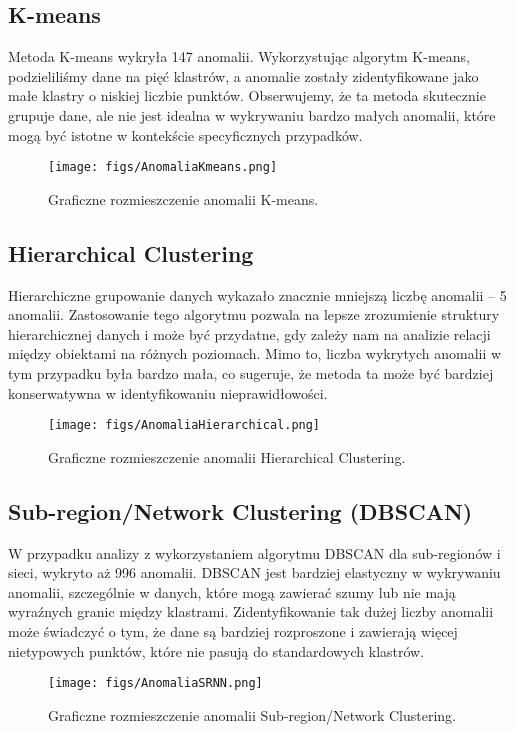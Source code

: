 \documentclass[a4paper,fleqn]{cas-dc}
\begin{document}
\subsection{K-means}
Metoda K-means wykryła 147 anomalii. Wykorzystując algorytm K-means, podzieliliśmy dane na pięć klastrów, a anomalie zostały zidentyfikowane jako małe klastry o niskiej liczbie punktów. Obserwujemy, że ta metoda skutecznie grupuje dane, ale nie jest idealna w wykrywaniu bardzo małych anomalii, które mogą być istotne w kontekście specyficznych przypadków.
\begin{figure}[!htb]
    \centering
        \texttt{[image: figs/AnomaliaKmeans.png]}
    \caption{Graficzne rozmieszczenie anomalii K-means.}
    \label{FIG:AnomaliaKmeans}
\end{figure}
\subsection{Hierarchical Clustering}
Hierarchiczne grupowanie danych wykazało znacznie mniejszą liczbę anomalii – 5 anomalii. Zastosowanie tego algorytmu pozwala na lepsze zrozumienie struktury hierarchicznej danych i może być przydatne, gdy zależy nam na analizie relacji między obiektami na różnych poziomach. Mimo to, liczba wykrytych anomalii w tym przypadku była bardzo mała, co sugeruje, że metoda ta może być bardziej konserwatywna w identyfikowaniu nieprawidłowości.
\begin{figure}[!htb]
    \centering
        \texttt{[image: figs/AnomaliaHierarchical.png]}
    \caption{Graficzne rozmieszczenie anomalii Hierarchical Clustering.}
    \label{FIG:AnomaliaHierarchical}
\end{figure}
\FloatBarrier
\subsection{Sub-region/Network Clustering (DBSCAN)}
W przypadku analizy z wykorzystaniem algorytmu DBSCAN dla sub-regionów i sieci, wykryto aż 996 anomalii. DBSCAN jest bardziej elastyczny w wykrywaniu anomalii, szczególnie w danych, które mogą zawierać szumy lub nie mają wyraźnych granic między klastrami. Zidentyfikowanie tak dużej liczby anomalii może świadczyć o tym, że dane są bardziej rozproszone i zawierają więcej nietypowych punktów, które nie pasują do standardowych klastrów.
\begin{figure}[!htb]
    \centering
        \texttt{[image: figs/AnomaliaSRNN.png]}
    \caption{Graficzne rozmieszczenie anomalii Sub-region/Network Clustering.}
    \label{FIG:AnomaliaSRNN}
\end{figure}
\FloatBarrier
\end{document}
